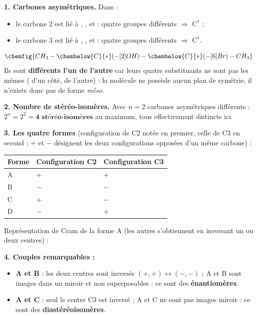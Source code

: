 \documentclass[11pt]{article}
\begin{document}
\begin{corrige}
\textbf{1. Carbones asymétriques.} Dans  :
\begin{itemize}
\item le carbone 2 est lié à , ,  et  : quatre groupes différents $\Rightarrow$ C$^*$ ;
\item le carbone 3 est lié à , ,  et  : quatre groupes différents $\Rightarrow$ C$^*$.
\end{itemize}
\[ \chemfig{CH_3-\chembelow{C}{*}(-[2]OH)-\chembelow{C}{*}(-[6]Br)-CH_3} \]
Ils sont \textbf{différents l'un de l'autre} car leurs quatre substituants ne sont pas les mêmes ( d'un côté,  de l'autre) : la molécule ne possède aucun plan de symétrie, il n'existe donc pas de forme \emph{méso}.

\textbf{2. Nombre de stéréo-isomères.} Avec $n = 2$ carbones asymétriques différents : $2^n = 2^2 = \textbf{4 stéréo-isomères}$ au maximum, tous effectivement distincts ici.

\textbf{3. Les quatre formes} (configuration de C2 notée en premier, celle de C3 en second ; $+$ et $-$ désignent les deux configurations opposées d'un même carbone) :
\begin{center}
\begin{tabularx}{\linewidth}{|l|X|X|}
\hline
\rowcolor{popblueL} \textbf{Forme} & \textbf{Configuration C2} & \textbf{Configuration C3} \\
\hline
A & $+$ & $+$ \\
\hline
B & $-$ & $-$ \\
\hline
C & $+$ & $-$ \\
\hline
D & $-$ & $+$ \\
\hline
\end{tabularx}
\end{center}
Représentation de Cram de la forme A (les autres s'obtiennent en inversant un ou deux centres) :
\begin{center}
\end{center}

\textbf{4. Couples remarquables :}
\begin{itemize}
\item \textbf{A et B} : les deux centres sont inversés $(+,+)\leftrightarrow(-,-)$ ; A et B sont images dans un miroir et non superposables : ce sont des \textbf{énantiomères}.
\item \textbf{A et C} : seul le centre C3 est inversé ; A et C ne sont pas images miroir : ce sont des \textbf{diastéréoisomères}.
\end{itemize}


\end{corrige}
\end{document}
